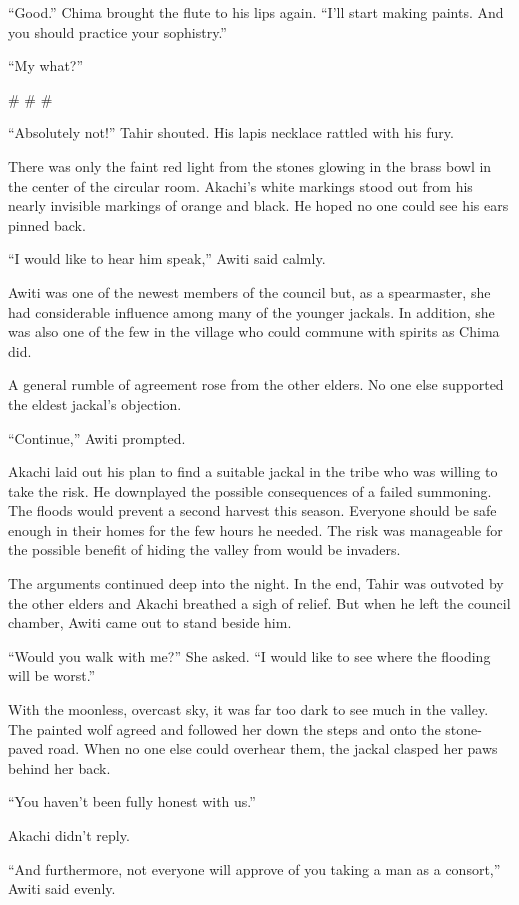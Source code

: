 ``Good.'' Chima brought the flute to his lips again. ``I'll start making paints. And you should practice your sophistry.''

``My what?''

\# \# \#

``Absolutely not!'' Tahir shouted. His lapis necklace rattled with his fury.

There was only the faint red light from the stones glowing in the brass bowl in the center of the circular room. Akachi's white markings stood out from his nearly invisible markings of orange and black. He hoped no one could see his ears pinned back.

``I would like to hear him speak,'' Awiti said calmly.

Awiti was one of the newest members of the council but, as a spearmaster, she had considerable influence among many of the younger jackals. In addition, she was also one of the few in the village who could commune with spirits as Chima did.

A general rumble of agreement rose from the other elders. No one else supported the eldest jackal's objection.

``Continue,'' Awiti prompted.

Akachi laid out his plan to find a suitable jackal in the tribe who was willing to take the risk. He downplayed the possible consequences of a failed summoning. The floods would prevent a second harvest this season. Everyone should be safe enough in their homes for the few hours he needed. The risk was manageable for the possible benefit of hiding the valley from would be invaders.

The arguments continued deep into the night. In the end, Tahir was outvoted by the other elders and Akachi breathed a sigh of relief. But when he left the council chamber, Awiti came out to stand beside him.

``Would you walk with me?'' She asked. ``I would like to see where the flooding will be worst.''

With the moonless, overcast sky, it was far too dark to see much in the valley. The painted wolf agreed and followed her down the steps and onto the stone-paved road. When no one else could overhear them, the jackal clasped her paws behind her back.

``You haven't been fully honest with us.''

Akachi didn't reply.

``And furthermore, not everyone will approve of you taking a man as a consort,'' Awiti said evenly.

